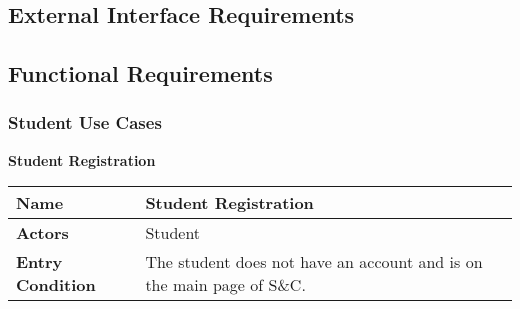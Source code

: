 

\subsection{External Interface Requirements}

\subsection{Functional Requirements}

    \subsubsection{Student Use Cases}
    
        \begin{enumerate}[label=\textbf{[US\arabic*]}, left = 0pt, align = left]
            \item \textbf{Student Registration}
            
            \begin{longtable}{|l|p{11cm}|}  
                \hline
                \textbf{Name} & 
                    \textbf{Student Registration} \\
                \hline
                
                \textbf{Actors} & 
                    Student \\
                \hline
                
                \textbf{Entry Condition} & 
                    The student does not have an account and is on the main page of S\&C. \\
                \hline
                

\end{longtable}
\end{enumerate}
